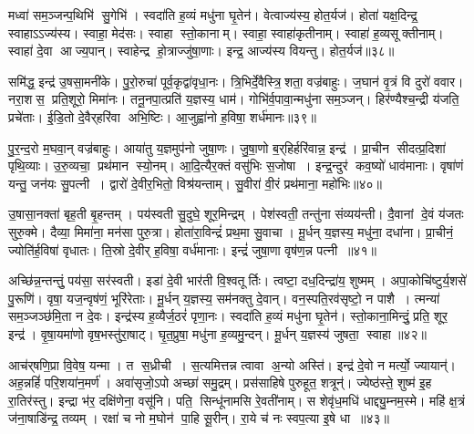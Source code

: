 मध्वा॑ सम॒ञ्जन्प॒थिभि॑ सु॒गेभि॑।
स्वदा॑ति ह॒व्यं मधु॑ना घृ॒तेन॑।
वेत्वाज्य॑स्य॒ होत॒र्यज॑।
होता॑ यक्ष॒दिन्द्र॒ स्वाहाऽऽज्य॑स्य।
स्वाहा॒ मेद॑सः।
स्वाहा स्तो॒कानाम्।
स्वाहा॒ स्वाहा॑कृतीनाम्।
स्वाहा॑ ह॒व्यसूक्तीनाम्।
स्वाहा॑ दे॒वा आज्य॒पान्।
स्वाहेन्द्र हो॒त्राज्जु॑षा॒णाः।
इन्द्र॒ आज्य॑स्य वियन्तु।
होत॒र्यज॑॥३८॥\anuvakamend[तेज॑साऽऽसददवर्धतां॒ भार॑तीन्द्रि॒यं जु॑षा॒णा द्वे च॑ (स॒मिधेन्द्र॒न्तनू॒नपा॑त॒मिडा॑भिर्ब॒र्॒हिष्योज॑ उ॒षे दैव्या॑ ति॒स्रस्त्वष्टा॑रं॒ वन॒स्पति॒मिन्द्रम् ॥ स॒मिधेन्द्रं॑ च॒तुर्वेत्वेको॑ वि॒यन्तु॒ द्विर्वी॒तामेको॑ वि॒यन्तु॒ द्विर्वेत्वेको॑ वि॒यन्तु॒ होत॒र्यज॑ ॥ )]

समि॑द्ध॒ इन्द्र॑ उ॒षसा॒मनी॑के।
पु॒रो॒रुचा॑ पूर्व॒कृद्वा॑वृधा॒नः।
त्रि॒भिर्दे॒वैस्त्रि॒शता॒ वज्र॑बाहुः।
ज॒घान॑ वृ॒त्रं वि दुरो॑ ववार।
नरा॒शस॒ प्रति॒शूरो॒ मिमा॑नः।
तनू॒नपा॒त्प्रति॑ य॒ज्ञस्य॒ धाम॑।
गोभि॑र्व॒पावा॒न्मधु॑ना सम॒ञ्जन्।
हिर॑ण्यैश्च॒न्द्री य॑जति॒ प्रचे॑ताः।
ई॒डि॒तो दे॒वैर्‌हरि॑वा अभि॒ष्टिः।
आ॒जुह्वा॑नो ह॒विषा॒ शर्ध॑मानः॥३९॥

पु॒र॒न्द॒रो म॒घवा॒न् वज्र॑बाहुः।
आया॑तु य॒ज्ञमुप॑नो जुषा॒णः।
जु॒षा॒णो ब॒र्‌हिर्हरि॑वान्न॒ इन्द्र॑।
प्रा॒चीन सीदत्प्र॒दिशा॑ पृथि॒व्याः।
उ॒रु॒व्यचा॒ प्रथ॑मान स्यो॒नम्।
आ॒दि॒त्यैर॒क्तं वसु॑भिः स॒जोषा।
इन्द्र॒न्दुर॑ कव॒ष्यो॑ धाव॑मानाः।
वृषा॑णं यन्तु॒ जन॑यः सु॒पत्नी।
द्वारो॑ दे॒वीर॒भितो॒ विश्र॑यन्ताम्।
सु॒वीरा॑ वी॒रं प्रथ॑माना॒ महो॑भिः॥४०॥

उ॒षासा॒नक्ता॑ बृह॒ती बृ॒हन्तम्।
पय॑स्वती सु॒दुघे॒ शूर॒मिन्द्रम्।
पेश॑स्वती॒ तन्तु॑ना संव्यय॑न्ती।
दै॒वानां दे॒वं य॑जतः सुरु॒क्मे।
दैव्या॒ मिमा॑ना॒ मन॑सा पुरु॒त्रा।
होता॑रा॒विन्द्रं॑ प्रथ॒मा सु॒वाचा।
मू॒र्धन् य॒ज्ञस्य॒ मधु॑ना॒ दधा॑ना।
प्रा॒चीनं॒ ज्योति॑र्\mbox{}ह॒विषा॑ वृधातः।
ति॒स्रो दे॒वीर्‌ ह॒विषा॒ वर्ध॑मानाः।
इन्द्रं॑ जुषा॒णा वृष॑ण॒न्न पत्नी॥४१॥

अच्छि॑न्न॒न्तन्तुं॒ पय॑सा॒ सर॑स्वती।
इडा॑ दे॒वी भार॑ती वि॒श्वतूर्तिः।
त्वष्टा॒ दध॒दिन्द्रा॑य॒ शुष्मम्।
अपा॒कोचि॑ष्टुर्य॒शसे॑ पु॒रूणि॑।
वृषा॒ यज॒न्वृष॑णं॒ भूरि॑रेताः।
मू॒र्धन् य॒ज्ञस्य॒ सम॑नक्तु दे॒वान्।
वन॒स्पति॒रव॑सृष्टो॒ न पाशै।
त्मन्या॑ सम॒ञ्जञ्छ॑मि॒ता न दे॒वः।
इन्द्र॑स्य ह॒व्यैर्ज॒ठरं॑ पृणा॒नः।
स्वदा॑ति ह॒व्यं मधु॑ना घृ॒तेन॑।
स्तो॒काना॒मिन्दुं॒ प्रति॒ शूर॒ इन्द्र॑।
वृ॒षा॒यमा॑णो वृष॒भस्तु॑रा॒षाट्।
घृ॒त॒प्रुषा॒ मधु॑ना ह॒व्यमु॒न्दन्।
मू॒र्धन् य॒ज्ञस्य॑ जुषता॒ स्वाहा॥४२॥\anuvakamend[शर्ध॑मानो॒ महो॑भि॒ पत्नीर्घृ॒तेन॑ च॒त्वारि॑ च]

आच॑र्‌षणि॒प्रा वि॒वेष॒ यन्मा।
त स॒ध्रीची।
स॒त्यमित्तन्न त्वावा अ॒न्यो अस्ति॑।
इन्द्र॑ दे॒वो न मर्त्यो॒ ज्यायान्॑।
अह॒न्नहिं॑ परि॒शया॑न॒मर्ण॑।
अवा॑सृजो॒ऽपो अच्छा॑ समु॒द्रम्।
प्रस॑साहिषे पुरुहूत॒ शत्रून्॑।
ज्येष्ठ॑स्ते॒ शुष्म॑ इ॒ह रा॒तिर॑स्तु।
इन्द्रा भ॑र॒ दक्षि॑णेना॒ वसू॑नि।
पति॒ सिन्धू॑नामसि रे॒वती॑नाम्।
स शेवृ॑ध॒मधि॑ धाद्द्यु॒म्नम॒स्मे।
महि॑ क्ष॒त्रं ज॑ना॒षाडि॑न्द्र॒ तव्यम्।
रक्षा॑ च नो म॒घोन॑ पा॒हि सू॒रीन्।
रा॒ये च॑ नः स्वप॒त्या इ॒षे धा॥४३॥\anuvakamend[रे॒वती॑नाञ्च॒त्वारि॑ च]

